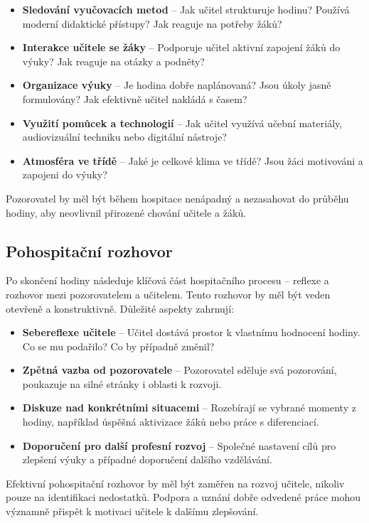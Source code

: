 \begin{itemize}
    \item \textbf{Sledování vyučovacích metod} – Jak učitel strukturuje hodinu? Používá moderní didaktické přístupy? Jak reaguje na potřeby žáků?
    \item \textbf{Interakce učitele se žáky} – Podporuje učitel aktivní zapojení žáků do výuky? Jak reaguje na otázky a podněty?
    \item \textbf{Organizace výuky} – Je hodina dobře naplánovaná? Jsou úkoly jasně formulovány? Jak efektivně učitel nakládá s časem?
    \item \textbf{Využití pomůcek a technologií} – Jak učitel využívá učební materiály, audiovizuální techniku nebo digitální nástroje?
    \item \textbf{Atmosféra ve třídě} – Jaké je celkové klima ve třídě? Jsou žáci motivováni a zapojeni do výuky?
\end{itemize}

Pozorovatel by měl být během hospitace nenápadný a nezasahovat do průběhu hodiny, aby neovlivnil přirozené chování učitele a žáků.

\subsection{Pohospitační rozhovor}
    Po skončení hodiny následuje klíčová část hospitačního procesu – reflexe a rozhovor mezi pozorovatelem a učitelem. Tento rozhovor by měl být veden otevřeně a konstruktivně. Důležité aspekty zahrnují:

\begin{itemize}
    \item \textbf{Sebereflexe učitele} – Učitel dostává prostor k vlastnímu hodnocení hodiny. Co se mu podařilo? Co by případně změnil?
    \item \textbf{Zpětná vazba od pozorovatele} – Pozorovatel sděluje svá pozorování, poukazuje na silné stránky i oblasti k rozvoji.
    \item \textbf{Diskuze nad konkrétními situacemi} – Rozebírají se vybrané momenty z hodiny, například úspěšná aktivizace žáků nebo práce s diferenciací.
    \item \textbf{Doporučení pro další profesní rozvoj} – Společné nastavení cílů pro zlepšení výuky a případné doporučení dalšího vzdělávání.
\end{itemize}

Efektivní pohospitační rozhovor by měl být zaměřen na rozvoj učitele, nikoliv pouze na identifikaci nedostatků. Podpora a uznání dobře odvedené práce mohou významně přispět k motivaci učitele k dalšímu zlepšování.

